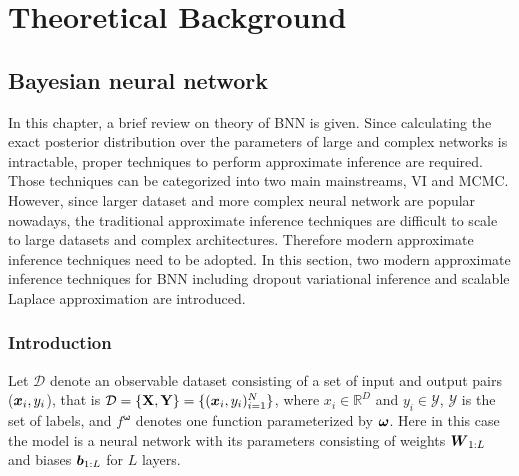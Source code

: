 \chapter{Theoretical Background}


\section{Bayesian neural network}
In this chapter, a brief review on theory of \gls{BNN} is given. Since calculating the exact posterior distribution over the parameters of large and complex networks is intractable, proper techniques to perform approximate inference are required. Those techniques can be categorized into two main mainstreams, \gls{VI} and \gls{MCMC}. %
However, since larger dataset and more complex neural network are popular nowadays, the traditional approximate inference techniques are difficult to scale to large datasets and complex architectures. Therefore modern approximate inference techniques need to be adopted. In this section, two modern approximate inference techniques for \gls{BNN} including dropout variational inference\cite{gal2016dropout} and scalable Laplace approximation\cite{ritter2018scalable} are introduced. 


\subsection{Introduction}

Let $\mathcal{D}$ denote an observable dataset consisting of a set of input and output pairs ($\boldsymbol x_i, y_i$), that is $\mathcal{D} = \{\mathbf{X}, \mathbf{Y}\} = \{(\boldsymbol x_{i}, y_{i})_{i=1}^{N}\}$, where $x_{i}\in\mathbb{R}^{D}$ and $y_{i}\in\mathcal{Y}$, $\mathcal{Y}$ is the set of labels, and $f^{\boldsymbol{\omega}}$ denotes one function parameterized by $\boldsymbol \omega$. Here in this case the model is a neural network with its parameters \boldmath{$\omega$} consisting of weights $\boldsymbol W_{1:L}$ and biases $\boldsymbol b_{1:L}$ for $L$ layers. 


